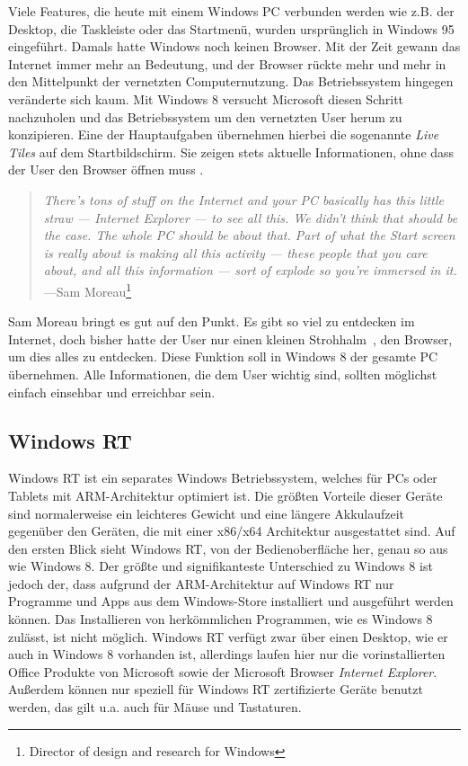 \documentclass[12pt,a4paper,bibtotoc,abstracton]{scrartcl}
\begin{document}
Viele Features, die heute mit einem Windows PC verbunden werden wie z.B. der Desktop, die Taskleiste oder das Startmenü, wurden ursprünglich in Windows 95 eingeführt. Damals hatte Windows noch keinen Browser. Mit der Zeit gewann das Internet immer mehr an Bedeutung, und der Browser rückte mehr und mehr in den Mittelpunkt der vernetzten Computernutzung. Das Betriebssystem hingegen veränderte sich kaum. Mit Windows 8 versucht Microsoft diesen Schritt nachzuholen und das Betriebssystem um den vernetzten User herum zu konzipieren. Eine der Hauptaufgaben übernehmen hierbei die sogenannte \textit{Live Tiles} auf dem Startbildschirm. Sie zeigen stets aktuelle Informationen, ohne dass der User den Browser öffnen muss \citep{Pachal2012}. 

\begin{quote}
\textit{There's tons of stuff on the Internet and your PC basically has this little straw — Internet Explorer — to see all this. We didn't think that should be the case. The whole PC should be about that. Part of what the Start screen is really about is making all this activity — these people that you care about, and all this information — sort of explode so you're immersed in it.} ---Sam Moreau\footnote{Director of design and research for Windows}
\end{quote}

Sam Moreau bringt es gut auf den Punkt. Es gibt so viel zu entdecken im Internet, doch bisher hatte der User nur einen kleinen \glqq Strohhalm\grqq\ , den Browser, um dies alles zu entdecken. Diese Funktion soll in Windows 8 der gesamte PC übernehmen. Alle Informationen, die dem User wichtig sind, sollten möglichst einfach einsehbar und erreichbar sein.

\subsection{Windows RT}
\label{subsec:winRT}
Windows RT ist ein separates Windows Betriebssystem, welches für PCs oder Tablets mit ARM-Architektur optimiert ist. Die größten Vorteile dieser Geräte sind normalerweise ein leichteres Gewicht und eine längere Akkulaufzeit gegenüber den Geräten, die mit einer x86/x64 Architektur ausgestattet sind. Auf den ersten Blick sieht Windows RT, von der Bedienoberfläche her, genau so aus wie Windows 8. Der größte und signifikanteste Unterschied zu Windows 8 ist jedoch der, dass aufgrund der ARM-Architektur auf Windows RT nur Programme und Apps aus dem Windows-Store installiert und ausgeführt werden können. Das Installieren von herkömmlichen Programmen, wie es Windows 8 zulässt, ist nicht möglich. Windows RT verfügt zwar über einen Desktop, wie er auch in Windows 8 vorhanden ist, allerdings laufen hier nur die vorinstallierten Office Produkte von Microsoft sowie der Microsoft Browser \textit{Internet Explorer}. Außerdem können nur speziell für Windows RT zertifizierte Geräte benutzt werden, das gilt u.a. auch für Mäuse und Tastaturen. \citep{MicrosoftWinRT}  
 
\end{document}

